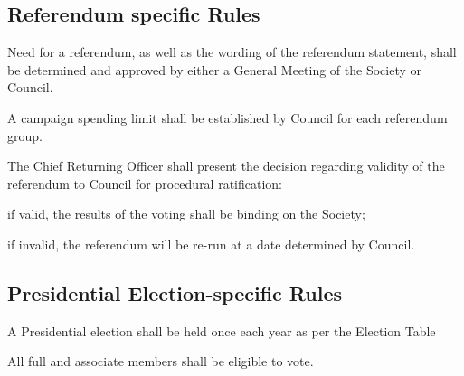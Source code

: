 \subsection{Referendum specific Rules}
\begin{longenum}[ label*=\thesubsection.\arabic*., align=left]
	\item Need for a referendum, as well as the wording of the referendum statement, shall be determined and approved by either a General Meeting of the Society or Council. 
    \item A campaign spending limit shall be established by Council for each referendum group.
    \item The Chief Returning Officer shall present the decision regarding validity of the referendum to Council for procedural ratification: 
    \begin{longenum}[ label*=\arabic*., align=left]
		\item if valid, the results of the voting shall be binding on the Society;
        \item if invalid, the referendum will be re-run at a date determined by Council.
	\end{longenum}
    
\end{longenum}

\subsection{Presidential Election-specific Rules}
\begin{longenum}[ label*=\thesubsection.\arabic*., align=left]
	\item A Presidential election shall be held once each year as per the Election Table
    \item All full and associate members shall be eligible to vote. 
\end{longenum}

